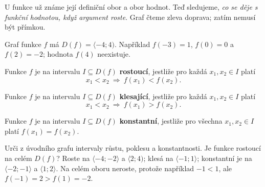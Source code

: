 \documentclass[11pt,a4paper]{article}
\begin{document}

U funkce už známe její definiční obor a obor hodnot.
Teď sledujeme, \emph{co se děje s funkční hodnotou, když argument roste}.
Graf čteme zleva doprava; zatím nemusí být přímkou.

\begin{center}
\end{center}

Graf funkce $f$ má $D(f)=\langle-4;4)$. Například
$f(-3)=1$, $f(0)=0$ a $f(2)=-2$; hodnota $f(4)$ neexistuje.

\begin{definiceBox}[title={Definice - Rostoucí funkce}]
Funkce $f$ je na intervalu $I\subseteq D(f)$ \textbf{rostoucí}, jestliže
pro každá $x_1,x_2\in I$ platí
\[
x_1<x_2\ \Longrightarrow\ f(x_1)<f(x_2).
\]
\end{definiceBox}
\begin{definiceBox}[title={Definice - Klesající funkce}]
Funkce $f$ je na intervalu $I\subseteq D(f)$ \textbf{klesající}, jestliže
pro každá $x_1,x_2\in I$ platí
\[
x_1<x_2\ \Longrightarrow\ f(x_1)>f(x_2).
\]
\end{definiceBox}
\begin{definiceBox}[title={Definice - Konstantní funkce}]
Funkce $f$ je na intervalu $I\subseteq D(f)$ \textbf{konstantní}, jestliže
pro všechna $x_1,x_2\in I$ platí $f(x_1)=f(x_2)$.
\end{definiceBox}

\begin{prikladReseniBox}[title={Příklad 1}]
Urči z úvodního grafu intervaly růstu, poklesu a konstantnosti.
Je funkce rostoucí na celém $D(f)$?
\tcblower
Roste na $\langle-4;-2\rangle$ a $\langle2;4)$;
klesá na $\langle-1;1\rangle$;
konstantní je na $\langle-2;-1\rangle$ a $\langle1;2\rangle$.
Na celém oboru neroste, protože například $-1<1$,
ale $f(-1)=2>f(1)=-2$.
\end{prikladReseniBox}
\end{document}
